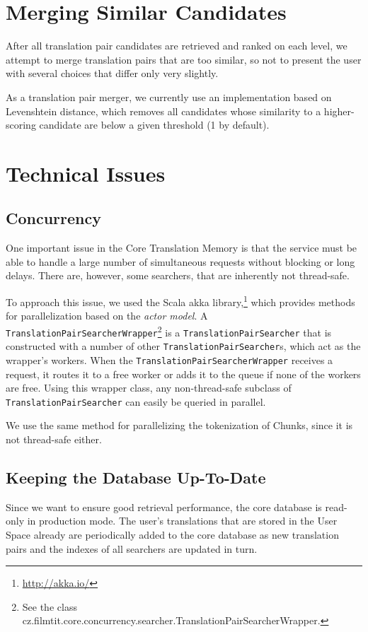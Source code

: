 \section{Merging Similar Candidates}

After all translation pair candidates are retrieved and ranked on each level, we attempt to merge translation pairs that are too similar, so not to present the user with several choices that differ only very slightly.

As a translation pair merger, we currently use an implementation based on Levenshtein distance, which removes all candidates whose similarity to a higher-scoring candidate are below a given threshold (1 by default).




\section{Technical Issues}

\subsection{Concurrency}

One important issue in the Core Translation Memory is that the service must be able to handle a large number of simultaneous requests without blocking or long delays. There are, however, some searchers, that are inherently not thread-safe.

To approach this issue, we used the Scala akka library,\footnote{\url{http://akka.io/}} which provides methods for parallelization based on the \emph{actor model}. A {\tt TranslationPairSearcherWrapper}\footnote{See  the class cz.filmtit.core.concurrency.searcher.TranslationPairSearcherWrapper.} is a {\tt TranslationPairSearcher} that is constructed with a number of other {\tt TranslationPairSearcher}s, which act as the wrapper's workers. When the {\tt TranslationPairSearcherWrapper} receives a request, it routes it to a free worker or adds it to the queue if none of the workers are free. Using this wrapper class, any non-thread-safe subclass of {\tt TranslationPairSearcher} can easily be queried in parallel.

We use the same method for parallelizing the tokenization of Chunks, since it is not thread-safe either.


\subsection{Keeping the Database Up-To-Date}

Since we want to ensure good retrieval performance, the core database is read-only in production mode. The user's translations that are stored in the User Space already are periodically added to the core database as new translation pairs and the indexes of all searchers are updated in turn.



